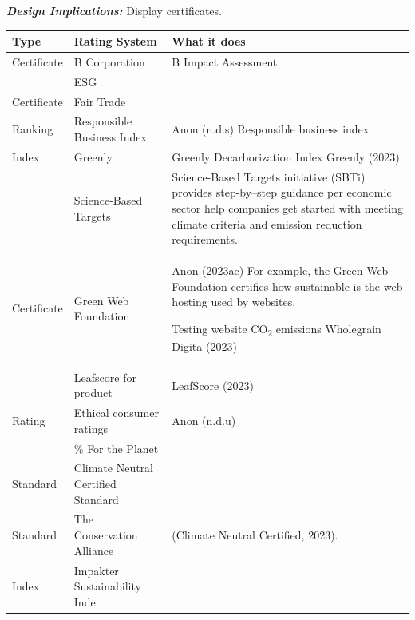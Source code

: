 \documentclass[
  letterpaper,
  DIV=11,
  numbers=noendperiod]{scrartcl}
\begin{document}
\textbf{\emph{Design Implications:}} Display certificates.

\begin{longtable}[]{@{}
  >{\raggedright\arraybackslash}p{}
  >{\raggedright\arraybackslash}p{}
  >{\raggedright\arraybackslash}p{}@{}}
\toprule\noalign{}
\begin{minipage}[b]{\linewidth}\raggedright
Type
\end{minipage} & \begin{minipage}[b]{\linewidth}\raggedright
Rating System
\end{minipage} & \begin{minipage}[b]{\linewidth}\raggedright
What it does
\end{minipage} \\
\midrule\noalign{}
\endhead
\bottomrule\noalign{}
\endlastfoot
Certificate & B Corporation & B Impact Assessment \\
& ESG & \\
Certificate & Fair Trade & \\
Ranking & Responsible Business Index & Anon (n.d.s) Responsible business
index \\
Index & Greenly & Greenly Decarborization Index Greenly (2023) \\
& Science-Based Targets & Science-Based Targets initiative (SBTi)
provides step-by--step guidance per economic sector help companies get
started with meeting climate criteria and emission reduction
requirements. \\
Certificate & Green Web Foundation & Anon (2023ae) For example, the
Green Web Foundation certifies how sustainable is the web hosting used
by websites.

Testing website CO\textsubscript{2} emissions Wholegrain Digita
(2023) \\
& Leafscore for product & LeafScore (2023) \\
Rating & Ethical consumer ratings & Anon (n.d.u) \\
& 1\% For the Planet & \\
Standard & Climate Neutral Certified Standard & \\
Standard & The Conservation Alliance & (Climate Neutral Certified,
2023). \\
Index & Impakter Sustainability Inde & \\
\end{longtable}
\end{document}
